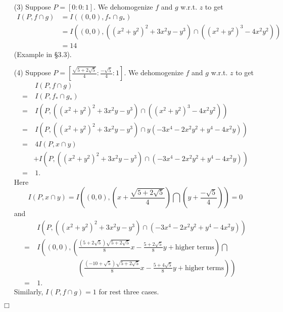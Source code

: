 \documentclass{article}
\begin{document}
\begin{enumerate}
\item[(3)]
  Suppose $P = [0:0:1]$.
  We dehomogenize $f$ and $g$ w.r.t. $z$ to get
  \begin{align*}
    I(P, f \cap g)
    &= I((0,0), f_{*} \cap g_{*}) \\
    &= I((0,0), ((x^2+y^2)^2 + 3x^2y - y^3) \cap ((x^2+y^2)^3 - 4x^2y^2)) \\
    &= 14
  \end{align*}
  (Example in \S 3.3).

\item[(4)]
  Suppose $P = \left[ \frac{\sqrt{5+2\sqrt{5}}}{4} : \frac{-\sqrt{5}}{4} : 1 \right]$.
  We dehomogenize $f$ and $g$ w.r.t. $z$ to get
  \begin{align*}
    & \: I(P, f \cap g) \\
    =& \: I(P, f_{*} \cap g_{*}) \\
    =& \: I(P, ((x^2+y^2)^2 + 3x^2y - y^3) \cap ((x^2+y^2)^3 - 4x^2y^2)) \\
    =& \: I(P, ((x^2+y^2)^2 + 3x^2y - y^3) \cap y(-3x^4-2x^2y^2+y^4 - 4x^2y)) \\
    =& \: 4 I(P, x \cap y) \\
      &+ I(P, ((x^2+y^2)^2 + 3x^2y - y^3) \cap (-3x^4-2x^2y^2+y^4 - 4x^2y)) \\
    =& \: 1.
  \end{align*}
  Here
  \[
    I(P, x \cap y)
    = I\left( (0,0),
      \left( x+\frac{\sqrt{5+2\sqrt{5}}}{4} \right)
      \bigcap \left( y + \frac{-\sqrt{5}}{4} \right) \right)
    = 0
  \]
  and
  \begin{align*}
    & \: I(P, ((x^2+y^2)^2 + 3x^2y - y^3) \cap (-3x^4-2x^2y^2+y^4 - 4x^2y)) \\
    =& \: I\left( (0,0), \left(
        \frac{(5+2\sqrt{5})\sqrt{5+2\sqrt{5}}}{8}x-\frac{5+2\sqrt{5}}{8}y + \text{higher terms}
      \right) \bigcap \right.\\
      & \qquad\qquad\qquad
      \left. \left(
        \frac{(-10+\sqrt{5})\sqrt{5+2\sqrt{5}}}{8}x-\frac{5+4\sqrt{5}}{8}y + \text{higher terms}
      \right) \right) \\
    =& \: 1.
  \end{align*}
  Similarly, $I(P, f \cap g) = 1$ for rest three cases.
\end{enumerate}
$\Box$ \\\\



\end{document}
